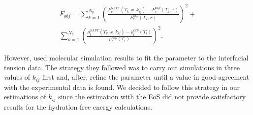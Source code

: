 \documentclass[
	12pt,				%
	openany,			%
	oneside,			%
	a4paper,			%
	english,			%
	brazil				%
	]{abntex2}
\providecommand{\DIFaddbegin}{}
\providecommand{\DIFaddend}{}
\providecommand{\DIFdelbegin}{}
\providecommand{\DIFdelend}{}
\providecommand{\DIFaddbegin}{} %
\providecommand{\DIFaddend}{} %
\providecommand{\DIFdelbegin}{} %
\providecommand{\DIFdelend}{} %
\begin{document}
\begin{equation}
\DIFdelbegin %
\DIFdelend \DIFaddbegin \begin{aligned}
F_{obj}= \sum_{k=1}^{N_{p}} \left(\frac{P_{v}^{SAFT}(T_{k},x,k_{ij})-P_{v}^{exp}(T_{k},x)}{P_{v}^{exp}(T_{k},x)} \right)^2 +\\
\sum_{k=1}^{N_{p}} \left(\frac{\rho_{l}^{SAFT}(T_{k},x,k_{ij})-\rho_{l}^{exp}(T_{i})}{\rho_{l}^{exp}(T_{i})} \right)^2 .
\end{aligned}
\DIFaddend \label{eqn:fobjmix}
\end{equation}

However,  used molecular simulation results to fit the parameter to the interfacial tension data. The strategy they followed was to carry out simulations in three values of $k_{ij}$ first and, after, refine the parameter until a value in good agreement with the experimental data is found. We decided to follow this strategy in our estimations of $k_{ij}$ since the estimation with the EoS did not provide satisfactory results for the hydration free energy calculations. 
\end{document}
